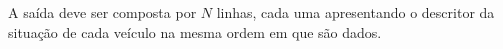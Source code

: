 A saída deve ser composta por $N$ linhas, cada uma apresentando o descritor da situação de cada veículo na mesma ordem em que são dados.